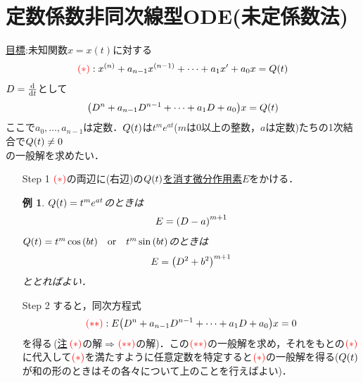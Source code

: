 \documentclass[autodetect-engine,dvipdfmx-if-dvi,ja=standard]{bxjsarticle}
\theoremstyle{mystyle1}
\theoremstyle{mystyle2}
\newtheorem{example}{例}
\newcommand{\redast}{\ensuremath{\color{red}\qty(\ast)\color{black}}}
\newcommand{\reddast}{\ensuremath{\color{red}\qty(\ast\ast)\color{black}}}
\begin{document}
\section{定数係数非同次線型ODE(未定係数法)}
\underline{目標}:未知関数$x=x\left(t\right)$に対する\begin{align*}
  \redast:x^{\qty(n)}+a_{n-1}x^{\qty(n-1)}+\cdots+a_1x^\prime +a_0x=Q\qty(t)
\end{align*}
$D=\dv{t}$として\begin{align*}
  \qty(D^n+a_{n-1}D^{n-1}+\cdots+a_1D+a_0)x=Q\qty(t)
\end{align*}ここで$a_0,\ldots,a_{n-1}$は定数．$Q\qty(t)$は$t^me^{at}$($m$は0以上の整数，$a$は定数)たちの1次結合で$Q\qty(t)\neq 0$\\
の一般解を求めたい．

\noindent [解き方]
\begin{itemize}
  \item[Step 1] \redast の両辺に(右辺)の\underline{$Q\qty(t)$を消す微分作用素$E$}をかける．\begin{example}
          $Q\qty(t)=t^me^{at}$のときは\begin{align*}
            E=\qty(D-a)^{m+1}
          \end{align*}$Q\qty(t)=t^m\cos\qty(bt)\qq{or}t^m\sin\qty(bt)$のときは\begin{align*}
            E=\qty(D^2+b^2)^{m+1}
          \end{align*}ととればよい．
        \end{example}
  \item[Step 2] すると，同次方程式\begin{align*}
          \reddast:E\qty(D^n+a_{n-1}D^{n-1}+\cdots+a_1D+a_0)x=0
        \end{align*}を得る\,(\underline{注}\,\redast の解$\Rightarrow$\reddast の解)．この\reddast の一般解を求め，それをもとの\redast に代入して\redast を満たすように任意定数を特定すると\redast の一般解を得る($Q\qty(t)$が和の形のときはその各々について上のことを行えばよい)．
\end{itemize}
\end{document}
